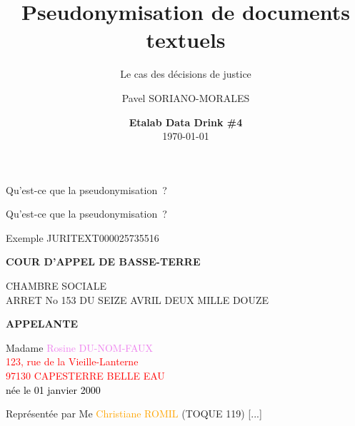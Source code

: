 \documentclass[10pt]{beamer}
\title{Pseudonymisation de documents textuels}
\subtitle{Le cas des décisions de justice}
\date{\textbf{Etalab Data Drink \#4} \\ \today}
\author{Pavel SORIANO-MORALES}
\institute{DINSIC -- ETALAB}
\begin{document}
\maketitle


\begin{frame}{Qu'est-ce que la pseudonymisation~?}


\end{frame}

\begin{frame}{Qu'est-ce que la pseudonymisation~?}

\begin{block}{Exemple JURITEXT000025735516}
	\newline
	
	\textbf{COUR D'APPEL DE BASSE-TERRE}
	
	
	CHAMBRE SOCIALE \\
	ARRET No 153 DU SEIZE AVRIL DEUX MILLE DOUZE
	\newline
	
	\textbf{APPELANTE}
	
	Madame \textcolor{violet}{Rosine DU-NOM-FAUX}\\
	\textcolor{red}{123, rue de la Vieille-Lanterne}\\
	
	\textcolor{red}{97130 CAPESTERRE BELLE EAU}\\
	\textcolor{black}{née le 01 janvier 2000}
	
	Représentée par Me \textcolor{orange}{Christiane ROMIL} (TOQUE 119) [...]
\end{block}

\end{frame}
\end{document}
